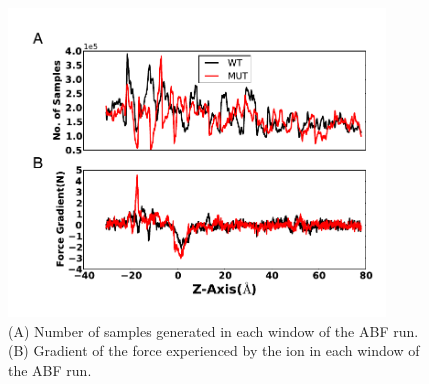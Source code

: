 \documentclass[12pt,onecolumn]{biophys}
\begin{document}
\begin{figure}
\begin{center}
\includegraphics[width = 100mm]{figures/Sup_ABF_plots_comp.pdf}
\end{center}
\caption{(A) Number of samples generated in each window of the ABF run. (B) Gradient of the force experienced by the ion in each window of the ABF run. }
\label{fig:ABF_2}
\end{figure}
\end{document}
